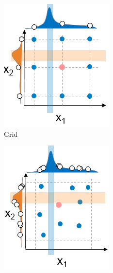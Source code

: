 \begin{figure}
	 \centering
	\begin{subfigure}[b]{0.25\linewidth}
		\includegraphics[width=\linewidth]{graphics/Background/hyperparameter-grid-search.png}
		\caption{Grid}
		\label{bg: fig:automated parameter tuning approaches: grid}
	\end{subfigure}
	\begin{subfigure}[b]{0.25\linewidth}
		\includegraphics[width=\linewidth]{graphics/Background/hyperparameter-random-search.png}

\end{subfigure}
\end{figure}
